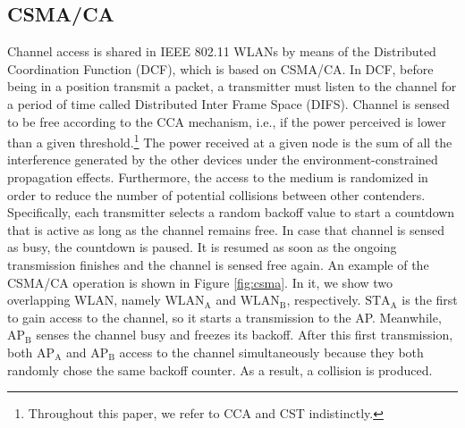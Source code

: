 \documentclass[preprint,12pt]{elsarticle}
\begin{document}
\subsection{CSMA/CA}
\label{section:csma}	
Channel access is shared in IEEE 802.11 WLANs by means of the Distributed Coordination Function (DCF), which is based on CSMA/CA. In DCF, before being in a position transmit a packet, a transmitter must listen to the channel for a period of time called Distributed Inter Frame Space (DIFS). Channel is sensed to be free according to the CCA mechanism, i.e., if the power perceived is lower than a given threshold.\footnote{Throughout this paper, we refer to CCA and CST indistinctly.} The power received at a given node is the sum of all the interference generated by the other devices under the environment-constrained propagation effects. Furthermore, the access to the medium is randomized in order to reduce the number of potential collisions between other contenders. Specifically, each transmitter selects a random backoff value to start a countdown that is active as long as the channel remains free. In case that channel is sensed as busy, the countdown is paused. It is resumed as soon as the ongoing transmission finishes and the channel is sensed free again. An example of the CSMA/CA operation is shown in Figure \ref{fig:csma}. In it, we show two overlapping WLAN, namely $\text{WLAN}_{\text{A}}$ and $\text{WLAN}_{\text{B}}$, respectively. $\text{STA}_{\text{A}}$ is the first to gain access to the channel, so it starts a transmission to the AP. Meanwhile, $\text{AP}_{\text{B}}$ senses the channel busy and freezes its backoff. After this first transmission, both $\text{AP}_{\text{A}}$ and $\text{AP}_{\text{B}}$ access to the channel simultaneously because they both randomly chose the same backoff counter. As a result, a collision is produced.
\end{document}
